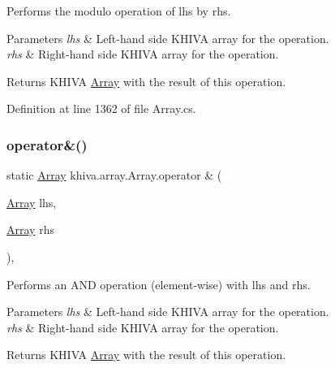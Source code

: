 Performs the modulo operation of lhs by rhs. 


\begin{DoxyParams}{Parameters}
{\em lhs} & Left-\/hand side K\+H\+I\+VA array for the operation.\\
\hline
{\em rhs} & Right-\/hand side K\+H\+I\+VA array for the operation.\\
\hline
\end{DoxyParams}
\begin{DoxyReturn}{Returns}
K\+H\+I\+VA \mbox{\hyperlink{classkhiva_1_1array_1_1_array}{Array}} with the result of this operation.
\end{DoxyReturn}


Definition at line 1362 of file Array.\+cs.

\mbox{\label{classkhiva_1_1array_1_1_array_a0f6a83bf6d269bbe810900ec48de4d8e}} 
\subsubsection{\texorpdfstring{operator\&()}{operator\&()}}
{\footnotesize\ttfamily static \mbox{\hyperlink{classkhiva_1_1array_1_1_array}{Array}} khiva.\+array.\+Array.\+operator \& (\begin{DoxyParamCaption}\item[{\mbox{\hyperlink{classkhiva_1_1array_1_1_array}{Array}}}]{lhs,  }\item[{\mbox{\hyperlink{classkhiva_1_1array_1_1_array}{Array}}}]{rhs }\end{DoxyParamCaption})\hspace{0.3cm}{\ttfamily [inline]}, {\ttfamily [static]}}



Performs an A\+ND operation (element-\/wise) with lhs and rhs. 


\begin{DoxyParams}{Parameters}
{\em lhs} & Left-\/hand side K\+H\+I\+VA array for the operation.\\
\hline
{\em rhs} & Right-\/hand side K\+H\+I\+VA array for the operation.\\
\hline
\end{DoxyParams}
\begin{DoxyReturn}{Returns}
K\+H\+I\+VA \mbox{\hyperlink{classkhiva_1_1array_1_1_array}{Array}} with the result of this operation.
\end{DoxyReturn}


